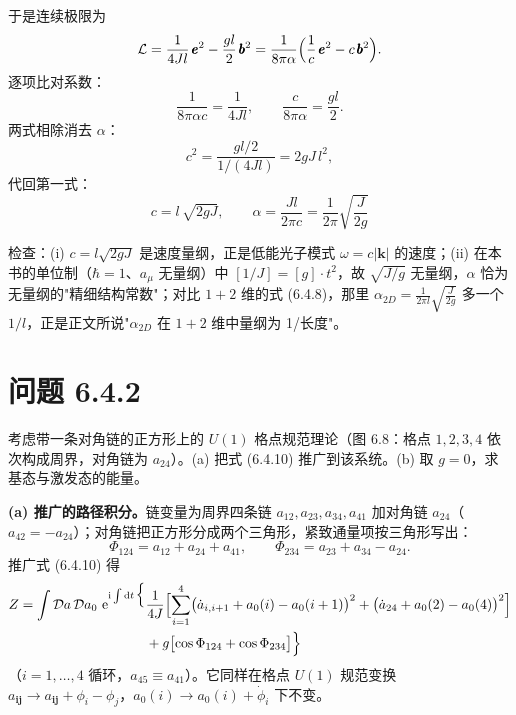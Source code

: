于是连续极限为
\begin{equation*}
\mathcal{L}=\frac{1}{4Jl}\,\pmb e^{2}-\frac{gl}{2}\,\pmb b^{2}
=\frac{1}{8\pi\alpha}\Bigl(\frac{1}{c}\,\pmb e^{2}-c\,\pmb b^{2}\Bigr) .
\end{equation*}
逐项比对系数：
\begin{equation*}
\frac{1}{8\pi\alpha c}=\frac{1}{4Jl},
\qquad
\frac{c}{8\pi\alpha}=\frac{gl}{2} .
\end{equation*}
两式相除消去 $\alpha$：
\begin{equation*}
c^{2}=\frac{gl/2}{1/(4Jl)}=2gJ\,l^{2},
\end{equation*}
代回第一式：
\begin{equation*}
\boxed{\ c=l\,\sqrt{2gJ},
\qquad
\alpha=\frac{Jl}{2\pi c}=\frac{1}{2\pi}\sqrt{\frac{J}{2g}}\ }
\end{equation*}

检查：(i) $c=l\sqrt{2gJ}$ 是速度量纲，正是低能光子模式 $\omega=c|\pmb k|$ 的速度；(ii) 在本书的单位制（$\hbar=1$、$a_\mu$ 无量纲）中 $[1/J]=[g]\cdot t^{2}$，故 $\sqrt{J/g}$ 无量纲，$\alpha$ 恰为无量纲的"精细结构常数"；对比 $1+2$ 维的式 (6.4.8)，那里 $\alpha_{2D}=\frac{1}{2\pi l}\sqrt{\frac{J}{2g}}$ 多一个 $1/l$，正是正文所说"$\alpha_{2D}$ 在 $1+2$ 维中量纲为 1/长度"。

\section*{问题 6.4.2}
\begin{problem}
考虑带一条对角链的正方形上的 $U(1)$ 格点规范理论（图 6.8：格点 $1,2,3,4$ 依次构成周界，对角链为 $a_{24}$）。(a) 把式 (6.4.10) 推广到该系统。(b) 取 $g=0$，求基态与激发态的能量。
\end{problem}
\solution

\textbf{(a) 推广的路径积分。}链变量为周界四条链 $a_{12},a_{23},a_{34},a_{41}$ 加对角链 $a_{24}$（$a_{42}=-a_{24}$）；对角链把正方形分成两个三角形，紧致通量项按三角形写出：
\begin{equation*}
\Phi_{124}=a_{12}+a_{24}+a_{41},
\qquad
\Phi_{234}=a_{23}+a_{34}-a_{24} .
\end{equation*}
推广式 (6.4.10) 得
\begin{align*}
Z=\int\mathcal{D}a\,\mathcal{D}a_0\ \mathrm{e}^{\mathrm{i}\int\mathrm{d}t\,\Bigl\{}
&\frac{1}{4J}\Bigl[\sum_{i=1}^{4}\bigl(\dot a_{i,i+1}+a_0(i)-a_0(i+1)\bigr)^{2}
+\bigl(\dot a_{24}+a_0(2)-a_0(4)\bigr)^{2}\Bigr]\\
&+g\bigl[\cos\Phi_{124}+\cos\Phi_{234}\bigr]\Bigr\}
\end{align*}
（$i=1,\dots,4$ 循环，$a_{45}\equiv a_{41}$）。它同样在格点 $U(1)$ 规范变换 $a_{\pmb{ij}}\to a_{\pmb{ij}}+\phi_i-\phi_j$，$a_0(i)\to a_0(i)+\dot\phi_i$ 下不变。

